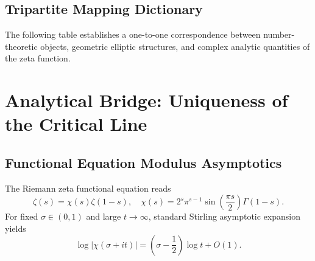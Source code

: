 \documentclass[10pt,reqno]{article}
\begin{document}
\subsection{Tripartite Mapping Dictionary}
\label{subsec:mapping}

The following table establishes a one-to-one correspondence between number-theoretic objects, geometric elliptic structures, and complex analytic quantities of the zeta function.

\begin{table}[htbp]
\centering
\caption{Tripartite bidirectional mapping}
\label{tab:mapping}
\end{table}

\section{Analytical Bridge: Uniqueness of the Critical Line}
\label{sec:analytical}

\subsection{Functional Equation Modulus Asymptotics}
\label{subsec:func-eq}

The Riemann zeta functional equation reads
\[
\zeta(s) = \chi(s)\zeta(1-s), \quad \chi(s)=2^{s}\pi^{s-1}\sin\left(\frac{\pi s}{2}\right)\Gamma(1-s).
\]
For fixed $\sigma\in(0,1)$ and large $t\to\infty$, standard Stirling asymptotic expansion yields
\begin{equation}
\log|\chi(\sigma+it)| = \left(\sigma-\frac12\right)\log t + O(1).
\label{eq:chi-asymptotic}
\end{equation}
\end{document}

